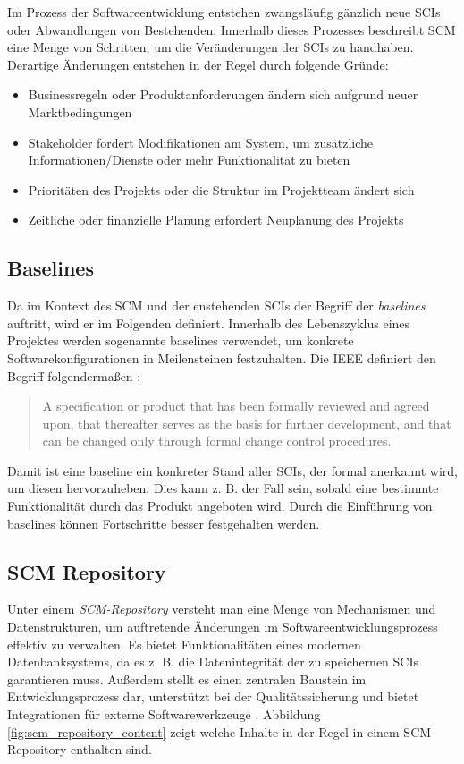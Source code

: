 \documentclass[runningheads,a4paper]{uwsese}
\begin{document}
Im Prozess der Softwareentwicklung entstehen zwangsläufig gänzlich neue SCIs oder
Abwandlungen von Bestehenden.
Innerhalb dieses Prozesses beschreibt SCM eine Menge von Schritten, um die
Veränderungen der SCIs zu handhaben. Derartige Änderungen entstehen in
der Regel durch folgende Gründe:

\begin{itemize}
	\item Businessregeln oder Produktanforderungen ändern sich aufgrund neuer Marktbedingungen
	\item Stakeholder fordert Modifikationen am System, um zusätzliche Informationen/Dienste
        oder mehr Funktionalität zu bieten
	\item Prioritäten des Projekts oder die Struktur im Projektteam ändert sich
	\item Zeitliche oder finanzielle Planung erfordert Neuplanung des Projekts
\end{itemize}

\subsection{Baselines}
Da im Kontext des SCM und der enstehenden SCIs der Begriff der {\em baselines} auftritt,
wird er im Folgenden definiert.
Innerhalb des Lebenszyklus eines Projektes werden sogenannte baselines
verwendet, um konkrete Softwarekonfigurationen in Meilensteinen festzuhalten.
Die IEEE definiert den Begriff folgendermaßen \cite[p. 588]{Pressman:2009:SEP:1593949}:

\begin{quote}
  A specification or product that has been formally reviewed and agreed upon,
  that thereafter serves as the basis for further development, and that can be
  changed only through formal change control procedures.
\end{quote}

Damit ist eine baseline ein konkreter Stand aller SCIs, der formal anerkannt
wird, um diesen hervorzuheben. Dies kann z. B. der Fall sein, sobald eine bestimmte
Funktionalität durch das Produkt angeboten wird. Durch die Einführung von baselines
können Fortschritte besser festgehalten werden.

\subsection{SCM Repository}
Unter einem {\em SCM-Repository} versteht man eine Menge von Mechanismen und
Datenstrukturen, um auftretende Änderungen im Softwareentwicklungsprozess
effektiv zu verwalten. Es bietet Funktionalitäten eines modernen Datenbanksystems,
da es z. B. die Datenintegrität der zu speichernen SCIs garantieren muss.
Außerdem stellt es einen zentralen Baustein im Entwicklungsprozess dar, unterstützt
bei der Qualitätssicherung und bietet Integrationen für externe Softwarewerkzeuge
\cite[p. 590f]{Pressman:2009:SEP:1593949}. Abbildung \ref{fig:scm_repository_content}
zeigt welche Inhalte in der Regel in einem SCM-Repository enthalten sind.
\end{document}
